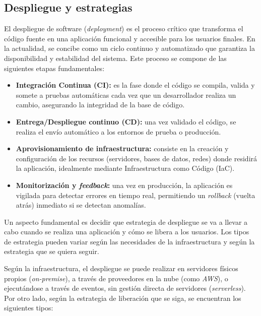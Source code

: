 \subsection{Despliegue y estrategias}

El despliegue de software (\textit{deployment}) es el proceso crítico que transforma el código fuente en una aplicación funcional 
y accesible para los usuarios finales. En la actualidad, se concibe como un ciclo continuo y automatizado que garantiza 
la disponibilidad y estabilidad del sistema. Este proceso se compone de las siguientes etapas fundamentales:

\begin{itemize}
    \item \textbf{Integración Continua (CI):} es la fase donde el código se compila, valida y somete a pruebas automáticas cada 
    vez que un desarrollador realiza un cambio, asegurando la integridad de la base de código.
    \item \textbf{Entrega/Despliegue continuo (CD):} una vez validado el código, se realiza el envío automático a los entornos 
    de prueba o producción.
    \item \textbf{Aprovisionamiento de infraestructura:} consiste en la creación y configuración de los recursos (servidores, 
    bases de datos, redes) donde residirá la aplicación, idealmente mediante Infraestructura como Código (IaC).
    \item \textbf{Monitorización y \textit{feedback}:} una vez en producción, la aplicación es vigilada para detectar errores en 
    tiempo real, permitiendo un \textit{rollback} (vuelta atrás) inmediato si se detectan anomalías.
\end{itemize}

Un aspecto fundamental es decidir que estrategia de despliegue se va a llevar a cabo cuando se realiza una aplicación 
y cómo se libera a los usuarios. Los tipos de estrategia pueden variar según las necesidades de la infraestructura y 
según la estrategia que se quiera seguir. 

Según la infraestructura, el despliegue se puede realizar en servidores físicos propios (\textit{on-premise}), a través 
de proveedores en la nube (como \textit{AWS}), o ejecutándose a través de eventos, sin gestión directa de servidores 
(\textit{serverless}). Por otro lado, según la estrategia de liberación que se siga, se encuentran los siguientes 
tipos: \cite{tiposDespliegue} 


